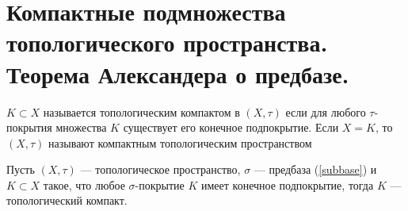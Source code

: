 \newpage
\section{Компактные подмножества топологического пространства. Теорема Александера о предбазе.}

\begin{definition}
	$K \subset X$ называется топологическим компактом в $(X, \tau)$ если для любого $\tau$- покрытия множества $K$ существует его конечное подпокрытие. Если $X = K$, то $(X, \tau)$ называют компактным топологическим пространством
\end{definition}
\begin{theorem}
	\label{th:asb}
	Пусть $(X, \tau)$ --- топологическое пространство, $\sigma$ --- предбаза (\ref{subbase}) и $K \subset X$ такое, что любое $\sigma$-покрытие $K$ имеет конечное подпокрытие, тогда $K$ --- топологический компакт.
\end{theorem}
